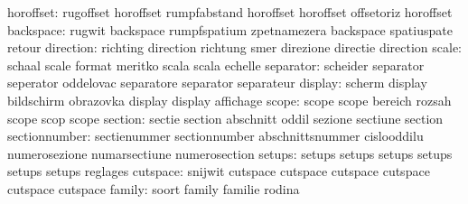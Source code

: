                 horoffset: rugoffset                 horoffset
                           rumpfabstand              horoffset
                           horoffset                 offsetoriz
                           horoffset
                backspace: rugwit                    backspace
                           rumpfspatium              zpetnamezera
                           backspace                 spatiuspate
                           retour
                direction: richting                  direction
                           richtung                  smer
                           direzione                 directie
                           direction
                    scale: schaal                    scale
                           format                    meritko
                           scala                     scala
                           echelle
                separator: scheider                  separator
                           seperator                 oddelovac
                           separatore                separator
                           separateur
                  display: scherm                    display
                           bildschirm                obrazovka
                           display                   display
                           affichage
                    scope: scope                     scope
                           bereich                   rozsah
                           scope                     scop
                           scope
                  section: sectie                    section
                           abschnitt                 oddil
                           sezione                   sectiune
                           section
            sectionnumber: sectienummer              sectionnumber
                           abschnittsnummer          cislooddilu
                           numerosezione             numarsectiune
                           numerosection
                   setups: setups                    setups
                           setups                    setups
                           setups                    setups
                           reglages
                 cutspace: snijwit                   cutspace
                           cutspace                  cutspace
                           cutspace                  cutspace
                           cutspace
                   family: soort                     family
                           familie                   rodina
